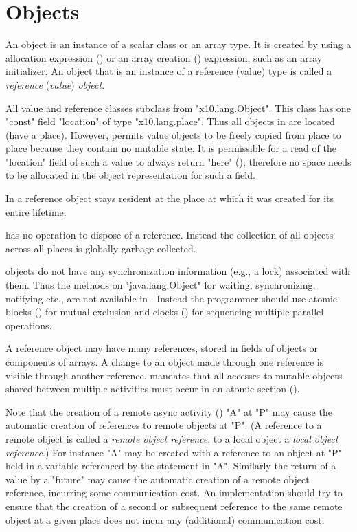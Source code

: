 \chapter{Objects}\label{XtenObjects}

An object is an instance of a scalar class or an array type.  It is
created by using a allocation expression
() or an array creation
() expression, such as an array
initializer. An object that is an instance of a reference (value) type
is called a {\em reference} ({\em value}) {\em object}.

All value and reference classes subclass from \xcd"x10.lang.Object".
This class has one \xcd"const" field \xcd"location" of type
\xcd"x10.lang.place".  Thus all objects in \Xten{}
are located (have a place). However, \Xten{} permits value objects to
be freely copied from place to place because they contain no mutable
state.  It is permissible for a read of the \xcd"location" field of
such a value to always return \xcd"here" ();
therefore no space needs to be allocated in the object representation
for such a field.

In \XtenCurrVer{} a reference object stays resident at the place at
which it was created for its entire lifetime.

{}\Xten{} has no operation to dispose of a reference.  Instead the
collection of all objects across all places is globally garbage
collected.

{}\Xten{} objects do not have any synchronization information (e.g.,
a lock) associated with them. Thus the methods on \xcd"java.lang.Object"
for waiting, synchronizing, notifying etc., are not
available in \Xten. Instead the programmer should use atomic blocks
() for mutual exclusion and clocks
() for sequencing multiple parallel operations.

A reference object may have many references, stored in fields of
objects or components of arrays. A change to an object made through
one reference is visible through another reference. \Xten{} mandates
that all accesses to mutable objects shared between multiple
activities must occur in an atomic section ().

Note that the creation of a remote async activity
() \xcd"A" at \xcd"P" may cause the automatic creation of
references to remote objects at \xcd"P". (A reference to a remote
object is called a {\em remote object reference}, to a local object a
{\em local object reference}.)  For instance \xcd"A" may be created
with a reference to an object at \xcd"P" held in a variable referenced
by the statement in \xcd"A".  Similarly the return of a value by a
\xcd"future" may cause the automatic creation of a remote object
reference, incurring some communication cost.  An {}\Xten{}
implementation should try to ensure that the creation of a second or
subsequent reference to the same remote object at a given place does
not incur any (additional) communication cost.

